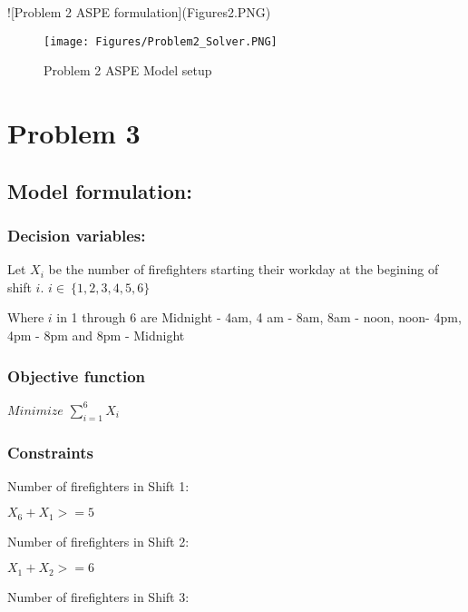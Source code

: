 \documentclass[]{article}
\begin{document}
\begin{landscape}

![Problem 2 ASPE formulation](Figures\Problem2.PNG)

\end{landscape}

\begin{figure}
\centering
\texttt{[image: Figures/Problem2\_Solver.PNG]}
\caption{Problem 2 ASPE Model setup}
\end{figure}

\pagebreak

\section{Problem 3}\label{problem-3}

\subsection{Model formulation:}\label{model-formulation-2}

\subsubsection{Decision variables:}\label{decision-variables-2}

Let \(X_{i}\) be the number of firefighters starting their workday at
the begining of shift \(i\). \(i \in\ \{1,2,3,4,5,6\}\)

Where \(i\) in 1 through 6 are Midnight - 4am, 4 am - 8am, 8am - noon,
noon- 4pm, 4pm - 8pm and 8pm - Midnight

\subsubsection{Objective function}\label{objective-function-2}

\(Minimize\) \(\sum_{i=1}^{6}X_{i}\)

\subsubsection{Constraints}\label{constraints-2}

Number of firefighters in Shift 1:

\(X_{6} + X_{1} >= 5\)

Number of firefighters in Shift 2:

\(X_{1} + X_{2} >= 6\)

Number of firefighters in Shift 3:
\end{document}
